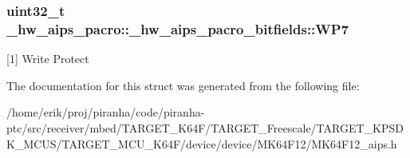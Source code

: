 \subsubsection[{\texorpdfstring{W\+P7}{WP7}}]{\setlength{\rightskip}{0pt plus 5cm}uint32\+\_\+t \+\_\+hw\+\_\+aips\+\_\+pacro\+::\+\_\+hw\+\_\+aips\+\_\+pacro\+\_\+bitfields\+::\+W\+P7}\hypertarget{struct__hw__aips__pacro_1_1__hw__aips__pacro__bitfields_a31989000863b0462f4951ecb6836886b}{}\label{struct__hw__aips__pacro_1_1__hw__aips__pacro__bitfields_a31989000863b0462f4951ecb6836886b}
\mbox{[}1\mbox{]} Write Protect 

The documentation for this struct was generated from the following file\+:\begin{DoxyCompactItemize}
\item 
/home/erik/proj/piranha/code/piranha-\/ptc/src/receiver/mbed/\+T\+A\+R\+G\+E\+T\+\_\+\+K64\+F/\+T\+A\+R\+G\+E\+T\+\_\+\+Freescale/\+T\+A\+R\+G\+E\+T\+\_\+\+K\+P\+S\+D\+K\+\_\+\+M\+C\+U\+S/\+T\+A\+R\+G\+E\+T\+\_\+\+M\+C\+U\+\_\+\+K64\+F/device/device/\+M\+K64\+F12/M\+K64\+F12\+\_\+aips.\+h\end{DoxyCompactItemize}
